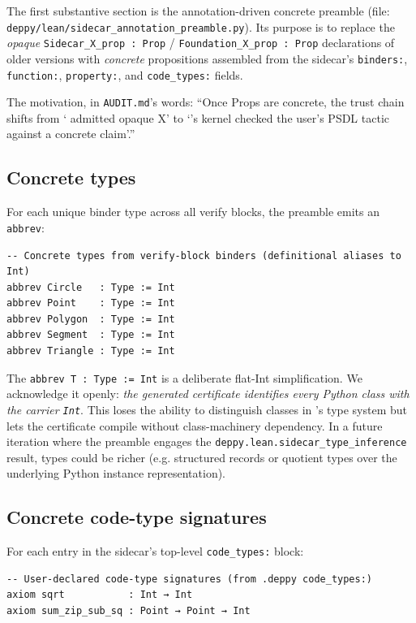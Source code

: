 The first substantive section is the annotation-driven concrete
preamble (file: \texttt{deppy/lean/sidecar\_annotation\_preamble.py}).
Its purpose is to replace the \emph{opaque}
\texttt{Sidecar\_X\_prop : Prop} / \texttt{Foundation\_X\_prop : Prop}
declarations of older versions with \emph{concrete} \Lean{}
propositions assembled from the sidecar's \texttt{binders:},
\texttt{function:}, \texttt{property:}, and \texttt{code\_types:}
fields.

The motivation, in \texttt{AUDIT.md}'s words: ``Once Props are
concrete, the trust chain shifts from `\Deppy{} admitted opaque
X' to `\Lean's kernel checked the user's PSDL tactic against a
concrete claim'.''

\subsection{Concrete types}

For each unique binder type across all verify blocks, the preamble
emits an \texttt{abbrev}:

\begin{lstlisting}[language=lean4]
-- Concrete types from verify-block binders (definitional aliases to Int)
abbrev Circle   : Type := Int
abbrev Point    : Type := Int
abbrev Polygon  : Type := Int
abbrev Segment  : Type := Int
abbrev Triangle : Type := Int
\end{lstlisting}

The \texttt{abbrev T : Type := Int} is a deliberate flat-Int
simplification.  We acknowledge it openly: \emph{the generated
certificate identifies every Python class with the carrier
\texttt{Int}}.  This loses the ability to distinguish classes in
\Lean's type system but lets the certificate compile without
class-machinery dependency.  In a future iteration where the
preamble engages the \texttt{deppy.lean.sidecar\_type\_inference}
result, types could be richer (e.g. structured records or
quotient types over the underlying Python instance representation).

\subsection{Concrete code-type signatures}

For each entry in the sidecar's top-level \texttt{code\_types:}
block:

\begin{lstlisting}[language=lean4]
-- User-declared code-type signatures (from .deppy code_types:)
axiom sqrt           : Int → Int
axiom sum_zip_sub_sq : Point → Point → Int
\end{lstlisting}


